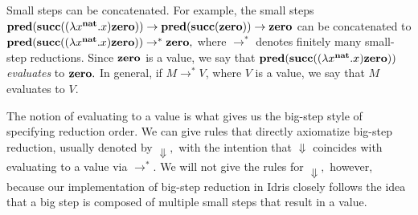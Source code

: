 Small steps can be concatenated. For example, the small steps $\textbf{pred}(\textbf{succ}((\lambda x^{\textbf{nat}}.x)\textbf{zero})) \to \textbf{pred}(\textbf{succ}(\textbf{zero})) \to \textbf{zero}$ can be concatenated to $\textbf{pred}(\textbf{succ}((\lambda x^{\textbf{nat}}.x)\textbf{zero})) \to^* \textbf{zero},$ where $\to^*$ denotes finitely many small-step reductions. Since $\textbf{zero}$ is a value, we say that $\textbf{pred}(\textbf{succ}((\lambda x^{\textbf{nat}}.x)\textbf{zero}))$ \textit{evaluates} to $\textbf{zero}.$ In general, if $M \to^* V$, where $V$ is a value, we say that $M$ evaluates to $V.$

The notion of evaluating to a value is what gives us the big-step style of specifying reduction order. We can give rules that directly axiomatize big-step reduction, usually denoted by $\Downarrow,$ with the intention that $\Downarrow$ coincides with evaluating to a value via $\to^*.$ We will not give the rules for $\Downarrow,$ however, because our implementation of big-step reduction in Idris closely follows the idea that a big step is composed of multiple small steps that result in a value.


